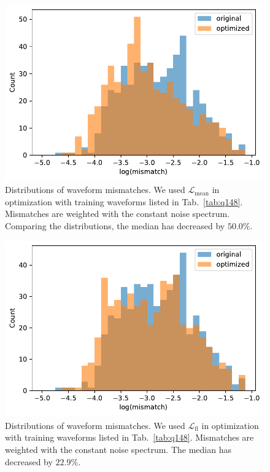 \documentclass[twocolumn]{aastex631}
\begin{document}
\begin{figure}[t]
	\centering
	\includegraphics[width=\columnwidth]{../static/q148.pdf}
	\caption{Distributions of waveform mismatches. We used $\mathcal{L}_{\mathrm{mean}}$ in optimization with training waveforms listed in Tab.~\ref{tab:q148}. Mismatches are weighted with the constant noise spectrum. Comparing the distributions, the median has decreased by $50.0\%$.}
	\label{fig:q148}
\end{figure}
\begin{figure}[t]
	\centering
	\includegraphics[width=\columnwidth]{../static/q148_fl.pdf}
	\caption{Distributions of waveform mismatches. We used $\mathcal{L}_{\mathrm{fl}}$ in optimization with training waveforms listed in Tab.~\ref{tab:q148}. Mismatches are weighted with the constant noise spectrum. The median has decreased by $22.9\%$.}
	\label{fig:q148_fl}
\end{figure}
\end{document}
